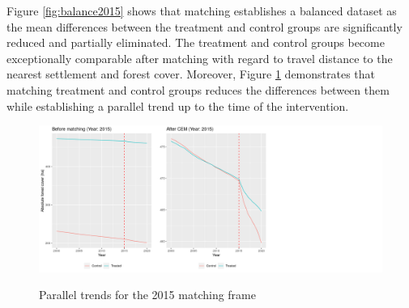 \documentclass{article}
\begin{document}
Figure \ref{fig:balance2015} shows that matching establishes a balanced dataset as the mean differences between the treatment and control groups are significantly reduced and partially eliminated. The treatment and control groups become exceptionally comparable after matching with regard to travel distance to the nearest settlement and forest cover. Moreover, Figure \ref{fig:parallel2015} demonstrates that matching treatment and control groups reduces the differences between them while establishing a parallel trend up to the time of the intervention.
%







\begin{figure}[H]
\centering
\caption{Parallel trends for the 2015 matching frame}
\includegraphics[width=1.3\linewidth]{"figures/create plots before after matching-1"}
\label{fig:parallel2015}
\end{figure}
\end{document}
